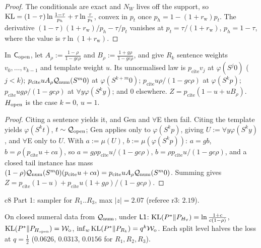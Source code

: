 \begin{proof}
The conditionals are exact and $N_W$ lives off the support, so $\mathrm{KL}=(1-\tau)\ln\frac{1-\tau}{p_h}+\tau\ln\frac\tau{p_t}$, convex in $p_t$ once $p_h=1-(1+r_{\mathrm w})p_t$. The derivative $(1-\tau)(1+r_{\mathrm w})/p_h-\tau/p_t$ vanishes at $p_t=\tau/(1+r_{\mathrm w})$, $p_h=1-\tau$, where the value is $\tau\ln(1+r_{\mathrm w})$.
\end{proof}

\begin{proposition}\label{prop:univ:rk}
In $\mathsf{C}_{\mathrm{open}}$, let $A_\rho:=\frac{1-\rho}{1-gc\rho}$ and $B_\rho:=\frac{1+g\rho}{1-gc\rho}$, and give $R_k$ sentence weights $v_0,\dots,v_{k-1}$ and template weight $u$. Its unnormalised law is $p_{\mathrm{cite}}v_j$ at $\varphi(S^j0)$ ($j<k$); $p_{\mathrm{cite}}uA_\rho\mathcal{Q}_{\mathrm{num}}(S^m0)$ at $\varphi(S^{k+m}0)$; $p_{\mathrm{cite}}u\rho/(1-gc\rho)$ at $\varphi(S^kp)$; $p_{\mathrm{cite}}ug\rho/(1-gc\rho)$ at $\forall y\varphi(S^ky)$; and $0$ elsewhere. $Z=p_{\mathrm{cite}}(1-u+uB_\rho)$. $H_{\mathrm{open}}$ is the case $k=0$, $u=1$.
\end{proposition}

\begin{proof}
Citing a sentence yields it, and Gen and $\forall$E then fail. Citing the template yields $\varphi(S^kt)$, $t\sim\mathcal{Q}_{\mathrm{open}}$; Gen applies only to $\varphi(S^kp)$, giving $U:=\forall y\varphi(S^ky)$, and $\forall$E only to $U$. With $a:=\mu(U)$, $b:=\mu(\varphi(S^kp))$: $a=gb$, $b=\rho(p_{\mathrm{cite}}u+ca)$, so $a=g\rho p_{\mathrm{cite}}u/(1-gc\rho)$, $b=\rho p_{\mathrm{cite}}u/(1-gc\rho)$, and a closed tail instance has mass $(1-\rho)\mathcal{Q}_{\mathrm{num}}(S^m0)(p_{\mathrm{cite}}u+ca)=p_{\mathrm{cite}}uA_\rho\mathcal{Q}_{\mathrm{num}}(S^m0)$. Summing gives $Z=p_{\mathrm{cite}}(1-u)+p_{\mathrm{cite}}u(1+g\rho)/(1-gc\rho)$.
\end{proof}

c8 Part 1: sampler for $R_1..R_3$, max $\lvert z\rvert=2.07$ (referee r3: $2.19$).

\begin{proposition}\label{prop:univ:rkrate}
On closed numeral data from $\mathcal{Q}_{\mathrm{num}}$, under $\mathord{\mathsf{L1}}$: $\mathrm{KL}(P^*\|P_{H_{\forall}})=\ln\frac{1+c}{c(1-\rho)}$, $\mathrm{KL}(P^*\|P_{H_{\mathrm{open}}})=\mathcal{W}_{\mathrm{o}}$, $\inf_w\mathrm{KL}(P^*\|P_{R_k})=q^k\mathcal{W}_{\mathrm{o}}$. Each split level halves the loss at $q=\tfrac12$ ($0.0626$, $0.0313$, $0.0156$ for $R_1,R_2,R_3$).
\end{proposition}

